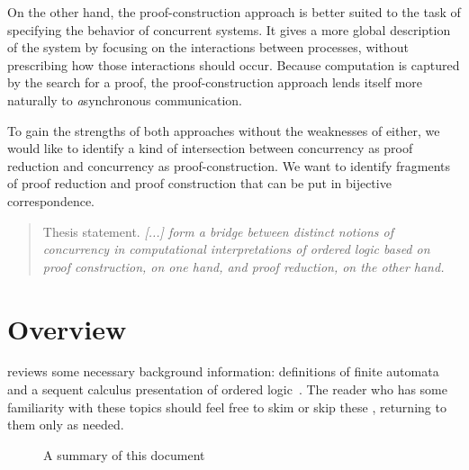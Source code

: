 On the other hand, the proof-construction approach is better suited to the task of specifying the behavior of concurrent systems.
It gives a more global description of the system by focusing on the interactions between processes, without prescribing how those interactions should occur.
Because computation is captured by the search for a proof, the proof-construction approach lends itself more naturally to \emph{a}synchronous communication.

To gain the strengths of both approaches without the weaknesses of either, we would like to identify a kind of intersection between concurrency as proof reduction and concurrency as proof-construction.
We want to identify fragments of proof reduction and proof construction that can be put in bijective correspondence.
\begin{quotation}
  \normalsize
  Thesis statement.
  \itshape [...] form a bridge between distinct notions of concurrency in computational interpretations of ordered logic based on proof construction, on one hand, and proof reduction, on the other hand.
\end{quotation}


\section{Overview}

 reviews some necessary background information: definitions of finite automata~ and a sequent calculus presentation of ordered logic~.
The reader who has some familiarity with these topics should feel free to skim or skip these , returning to them only as needed.

\begin{figure}[tp]
  \centering
  \caption{A summary of this document}
  \label{fig:introduction:summary}
\end{figure}

